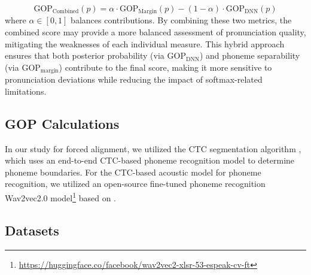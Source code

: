 \documentclass{Interspeech}
\begin{document}
\vspace{-0.2cm}
\begin{equation}
    \text{GOP}_{\text{Combined}}(p) = \alpha \cdot \text{GOP}_{\text{Margin}}(p) - (1-\alpha) \cdot \text{GOP}_{\text{DNN}}(p)
    \label{eq:gop_combined}
\end{equation}
where \( \alpha \in [0,1] \) balances contributions. By combining these two metrics, the combined score may provide a more balanced assessment of pronunciation quality, mitigating the weaknesses of each individual measure. This hybrid approach ensures that both posterior probability (via $\text{GOP}_\text{DNN}$) and phoneme separability (via $\text{GOP}_\text{margin}$) contribute to the final score, making it more sensitive to pronunciation deviations while reducing the impact of softmax-related limitations.





\subsection{GOP Calculations}

In our study for forced alignment, we utilized the CTC segmentation algorithm \cite{kurzinger2020ctc}, which uses an end-to-end CTC-based phoneme recognition model to determine phoneme boundaries. For the CTC-based acoustic model for phoneme recognition, we utilized an open-source fine-tuned phoneme recognition Wav2vec2.0 model\footnote{\tiny\url{https://huggingface.co/facebook/wav2vec2-xlsr-53-espeak-cv-ft}} based on \cite{xu22b_interspeech}.


\subsection{Datasets}
\label{dataset-info}

\end{document}
